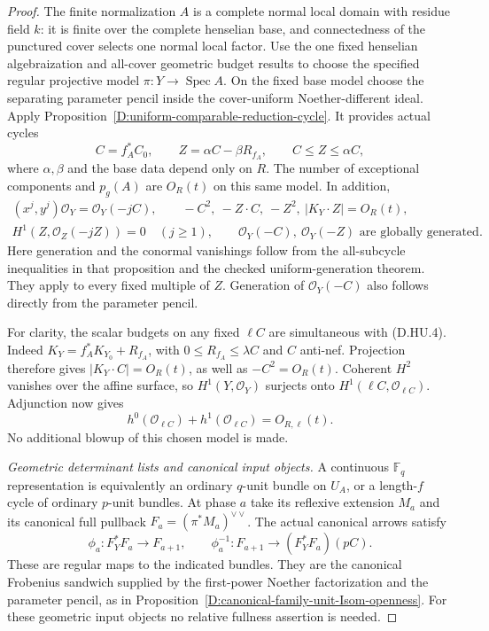 \begin{proof}
The finite normalization $A$ is a complete normal local domain
with residue field $k$: it is finite over the complete henselian
base, and connectedness of the punctured cover selects one
normal local factor. Use the one fixed henselian algebraization
and all-cover geometric budget results to choose the specified
regular projective model $\pi:Y\to\operatorname{Spec}A$.
On the fixed base model choose the separating parameter pencil
inside the cover-uniform Noether-different ideal. Apply
Proposition~\ref{D:uniform-comparable-reduction-cycle}.
It provides actual cycles
\[
 C=f_A^*C_0,\qquad Z=\alpha C-\beta R_{f_A},\qquad
                C\le Z\le\alpha C,                     \tag{D.HU.3}
\]
where $\alpha,\beta$ and the base data depend only on $R$.
The number of exceptional components and $p_g(A)$ are $O_R(t)$
on this same model. In addition,
\[
 \begin{gathered}
 (x^j,y^j)\mathcal O_Y=\mathcal O_Y(-jC),\qquad
 -C^2,\ -Z\cdot C,\ -Z^2,\ |K_Y\cdot Z|=O_R(t),\\
 H^1(Z,\mathcal O_Z(-jZ))=0\quad(j\ge1),\qquad
 \mathcal O_Y(-C),\ \mathcal O_Y(-Z)
          \text{ are globally generated}.
 \end{gathered}                                        \tag{D.HU.4}
\]
Here generation and the conormal vanishings follow from the
all-subcycle inequalities in that proposition and the checked
uniform-generation theorem. They apply to every fixed multiple
of $Z$. Generation of $\mathcal O_Y(-C)$ also follows directly
from the parameter pencil.

For clarity, the scalar budgets on any fixed $\ell C$ are
simultaneous with (D.HU.4). Indeed
$K_Y=f_A^*K_{Y_0}+R_{f_A}$, with
$0\le R_{f_A}\le\lambda C$ and $C$ anti-nef. Projection
therefore gives $|K_Y\cdot C|=O_R(t)$, as well as
$-C^2=O_R(t)$. Coherent $H^2$ vanishes over the affine
surface, so $H^1(Y,\mathcal O_Y)$ surjects onto
$H^1(\ell C,\mathcal O_{\ell C})$. Adjunction now gives
\[
 h^0(\mathcal O_{\ell C})+h^1(\mathcal O_{\ell C})
                              =O_{R,\ell}(t).            \tag{D.HU.5}
\]
No additional blowup of this chosen model is made.

\emph{Geometric determinant lists and canonical input objects.}
A continuous $\mathbb F_q$ representation is equivalently an
ordinary $q$-unit bundle on $U_A$, or a length-$f$ cycle of
ordinary $p$-unit bundles. At phase $a$ take its reflexive
extension $M_a$ and its canonical full pullback
$F_a=(\pi^*M_a)^{\vee\vee}$. The actual canonical arrows
satisfy
\[
 \phi_a:F_Y^*F_a\longrightarrow F_{a+1},\qquad
 \phi_a^{-1}:F_{a+1}\longrightarrow(F_Y^*F_a)(pC).
                                                               \tag{D.HU.6}
\]
These are regular maps to the indicated bundles. They are
the canonical Frobenius sandwich supplied by the first-power
Noether factorization and the parameter pencil, as in
Proposition~\ref{D:canonical-family-unit-Isom-openness}.
For these geometric input objects no relative fullness
assertion is needed.


\end{proof}
